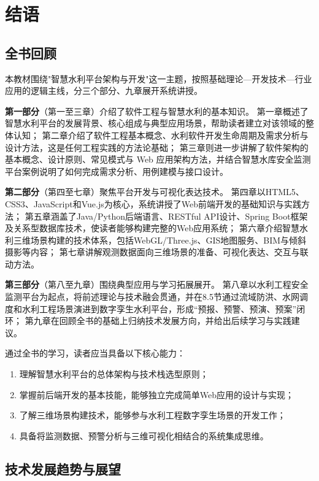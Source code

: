 \chapter{结语}\label{ch:conclusion}

\section{全书回顾}

本教材围绕"智慧水利平台架构与开发"这一主题，按照基础理论—开发技术—行业应用的逻辑主线，分三个部分、九章展开系统讲授。

\textbf{第一部分}（第一至三章）介绍了软件工程与智慧水利的基本知识。
第一章概述了智慧水利平台的发展背景、核心组成与典型应用场景，帮助读者建立对该领域的整体认知；
第二章介绍了软件工程基本概念、水利软件开发生命周期及需求分析与设计方法，这是任何工程实践的方法论基础；
第三章则进一步讲解了软件架构的基本概念、设计原则、常见模式与 Web 应用架构方法，并结合智慧水库安全监测平台案例说明了如何完成需求分析、用例建模与接口设计。

\textbf{第二部分}（第四至七章）聚焦平台开发与可视化表达技术。
第四章以HTML5、CSS3、JavaScript和Vue.js为核心，系统讲授了Web前端开发的基础知识与实践方法；
第五章涵盖了Java/Python后端语言、RESTful API设计、Spring Boot框架及关系型数据库技术，使读者能够构建完整的Web应用系统；
第六章介绍智慧水利三维场景构建的技术体系，包括WebGL/Three.js、GIS地图服务、BIM与倾斜摄影等内容；
第七章讲解观测数据面向三维场景的准备、可视化表达、交互与联动方法。

\textbf{第三部分}（第八至九章）围绕典型应用与学习拓展展开。
第八章以水利工程安全监测平台为起点，将前述理论与技术融会贯通，并在8.5节通过流域防洪、水网调度和水利工程场景演进到数字孪生水利平台，形成“预报、预警、预演、预案”闭环；
第九章在回顾全书的基础上归纳技术发展方向，并给出后续学习与实践建议。

通过全书的学习，读者应当具备以下核心能力：
\begin{enumerate}
\item 理解智慧水利平台的总体架构与技术栈选型原则；
\item 掌握前后端开发的基本技能，能够独立完成简单Web应用的设计与实现；
\item 了解三维场景构建技术，能够参与水利工程数字孪生场景的开发工作；
\item 具备将监测数据、预警分析与三维可视化相结合的系统集成思维。
\end{enumerate}

\section{技术发展趋势与展望}

